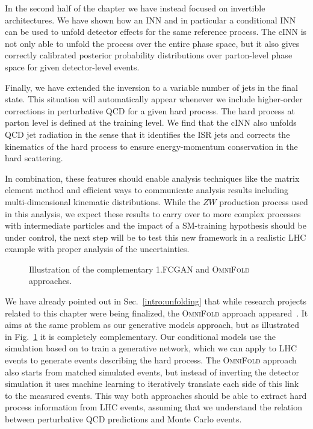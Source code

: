 In the second half of the chapter we have instead focused on invertible
architectures.
We have shown how an INN and in particular a
conditional INN can be used to unfold detector effects for the same
reference process. The cINN is not only able to unfold the process over the entire phase
space, but it also gives correctly calibrated posterior probability
distributions over parton-level phase space for given detector-level
events.

Finally, we have extended the inversion to a variable number of jets in
the final state. This situation will automatically appear whenever we
include higher-order corrections in perturbative QCD for a given hard
process. The hard process at parton level is defined at the training
level. We find that the cINN also unfolds QCD jet radiation in the
sense that it identifies the ISR jets and corrects the kinematics of
the hard process to ensure energy-momentum conservation in the hard
scattering.

In combination, these features should enable analysis techniques like
the matrix element method and efficient ways to communicate analysis
results including multi-dimensional kinematic distributions. While the
$ZW$ production process used in this analysis, we expect these results
to carry over to more complex processes with intermediate
particles and the impact of a SM-training
hypothesis should be under control, the next step will be
to test this new framework in a realistic LHC example with proper analysis of the
uncertainties.

\begin{figure}[b!]
\centering

\caption{Illustration of the complementary 1.FCGAN and
  \textsc{OmniFold}~\cite{Andreassen:2019cjw} approaches.}
\label{fig:flow}
\end{figure}

We have already pointed out in Sec.~\ref{intro:unfolding} that while research 
projects related to this chapter were being finalized, the \textsc{OmniFold} approach
appeared~\cite{Andreassen:2019cjw}. It aims at the same problem as our 
generative models approach,
but as illustrated in Fig.~\ref{fig:flow} it is completely
complementary. Our conditional models use the simulation based on \delphes to
train a generative network, which we can apply to LHC events to
generate events describing the hard process. The \textsc{OmniFold}
approach also starts from matched simulated events, but instead of
inverting the detector simulation it uses machine learning to
iteratively translate each side of this link to the measured events.
This way both approaches should be able to extract hard process
information from LHC events, assuming that we understand the relation
between perturbative QCD predictions and Monte Carlo events.

